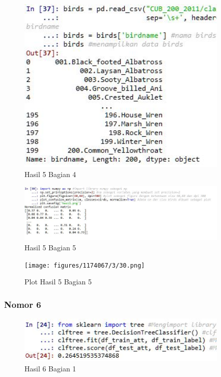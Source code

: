 
\begin{figure}[H]
\centerline{\includegraphics[width=10cm]{figures/1174067/3/28.jpg}}
\caption{Hasil 5 Bagian 4}
\label{labelgambar}
\end{figure}


\begin{figure}[H]
\centerline{\includegraphics[width=10cm]{figures/1174067/3/29.jpg}}
\caption{Hasil 5 Bagian 5}
\label{labelgambar}
\end{figure}

\begin{figure}[H]
\centerline{\texttt{[image: figures/1174067/3/30.png]}}
\caption{Plot Hasil 5 Bagian 5}
\label{labelgambar}
\end{figure}

\subsubsection{Nomor 6}
\hfill\break

\begin{figure}[H]
\centerline{\includegraphics[width=10cm]{figures/1174067/3/31.jpg}}
\caption{Hasil 6 Bagian 1}
\label{labelgambar}
\end{figure}

